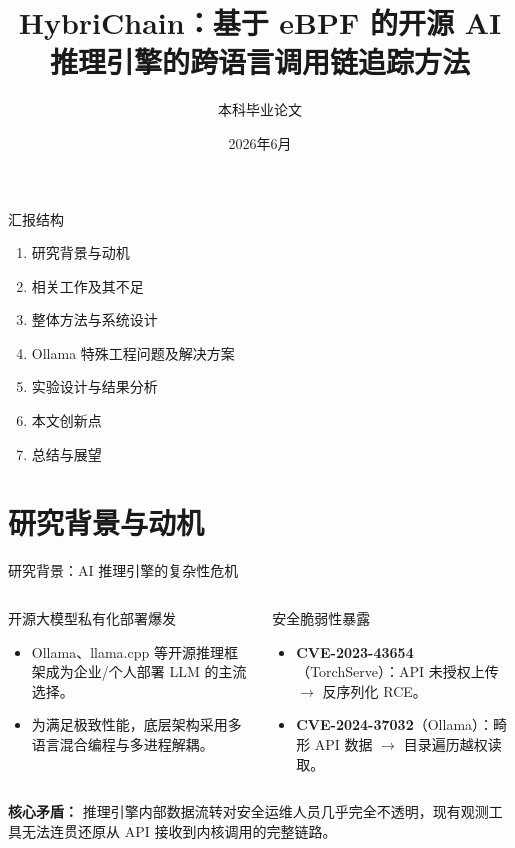 \documentclass[aspectratio=169, 10pt]{beamer}
\title[HybriChain汇报]{HybriChain：基于 eBPF 的开源 AI 推理引擎的跨语言调用链追踪方法}
\author{本科毕业论文}
\institute[四川大学网络空间安全学院]{四川大学网络空间安全学院}
\date{2026年6月}
\begin{document}
\frame{\titlepage}

\begin{frame}{汇报结构}
    \begin{enumerate}
        \setlength{\itemsep}{0.8em}
        \item 研究背景与动机
        \item 相关工作及其不足
        \item 整体方法与系统设计
        \item Ollama 特殊工程问题及解决方案
        \item 实验设计与结果分析
        \item 本文创新点
        \item 总结与展望
    \end{enumerate}
\end{frame}

\section{研究背景与动机}
\begin{frame}{研究背景：AI 推理引擎的复杂性危机}
    \begin{columns}
        \begin{block}{开源大模型私有化部署爆发}
            \begin{itemize}
                \item Ollama、llama.cpp 等开源推理框架成为企业/个人部署 LLM 的主流选择。
                \item 为满足极致性能，底层架构采用多语言混合编程与多进程解耦。
            \end{itemize}
        \end{block}

        \begin{alertblock}{安全脆弱性暴露}
            \begin{itemize}
                \item \textbf{CVE-2023-43654}（TorchServe）：API 未授权上传 $\to$ 反序列化 RCE。
                \item \textbf{CVE-2024-37032}（Ollama）：畸形 API 数据 $\to$ 目录遍历越权读取。
            \end{itemize}
        \end{alertblock}
    \end{columns}

    \vspace{0.8em}
    \textbf{核心矛盾：} 推理引擎内部数据流转对安全运维人员几乎完全不透明，现有观测工具无法连贯还原从 API 接收到内核调用的完整链路。
\end{frame}
\end{document}
